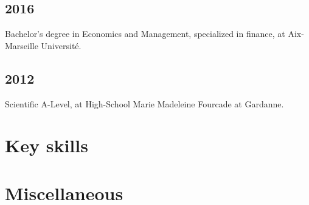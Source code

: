 \documentclass[a4paper,11pt]{arthur-cv}
\begin{document}
\begin{textblock}{17}
\begin{minipage}[t]{0.66\textwidth}
      \subsection{2016}{Bachelor’s degree in Economics and Management, specialized in finance, at Aix-Marseille Université.}
      \subsection{2012}{Scientific A-Level, at High-School Marie Madeleine Fourcade at Gardanne.}


   \section{Key skills}

   \section{Miscellaneous}

  \end{minipage}

\end{textblock}
\end{document}
